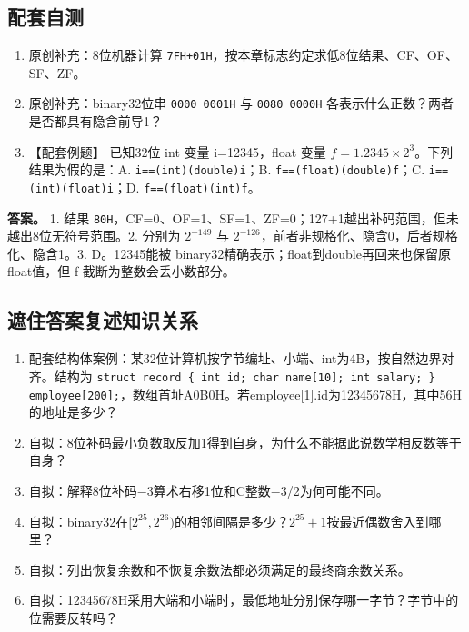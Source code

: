 \subsection{配套自测}\label{CO02-27}

\begin{enumerate}
\def\labelenumi{\arabic{enumi}.}
\tightlist
\item
  原创补充：8位机器计算 \texttt{7FH+\allowbreak{}01H}，按本章标志约定求低8位结果、CF、OF、SF、ZF。
\item
  原创补充：binary32位串 \texttt{0000 0001H} 与 \texttt{0080 0000H} 各表示什么正数？两者是否都具有隐含前导1？
\item
  【配套例题】 已知32位 int 变量 i=12345，float 变量 \(f=1.2345\times2^3\)。下列结果为假的是：A. \texttt{i=\allowbreak{}=\allowbreak{}(\allowbreak{}int)\allowbreak{}(\allowbreak{}double)\allowbreak{}i}；B. \texttt{f=\allowbreak{}=\allowbreak{}(\allowbreak{}float)\allowbreak{}(\allowbreak{}double)\allowbreak{}f}；C. \texttt{i=\allowbreak{}=\allowbreak{}(\allowbreak{}int)\allowbreak{}(\allowbreak{}float)\allowbreak{}i}；D. \texttt{f=\allowbreak{}=\allowbreak{}(\allowbreak{}float)\allowbreak{}(\allowbreak{}int)\allowbreak{}f}。
\end{enumerate}

\textbf{答案。} 1. 结果 \texttt{80H}，CF=0、OF=1、SF=1、ZF=0；127+1越出补码范围，但未越出8位无符号范围。2. 分别为 \(2^{-149}\) 与 \(2^{-126}\)，前者非规格化、隐含0，后者规格化、隐含1。3. D。12345能被 binary32精确表示；float到double再回来也保留原float值，但 f 截断为整数会丢小数部分。

\subsection{遮住答案复述知识关系}\label{CO02-recall-new}

\begin{recallcard}[主动回忆·自拟]

\begin{enumerate}
\def\labelenumi{\arabic{enumi}.}
\setcounter{enumi}{3}
\tightlist
\item
  配套结构体案例：某32位计算机按字节编址、小端、int为4B，按自然边界对齐。结构为 \texttt{struct record \{ int id;\allowbreak{} char name[\allowbreak{}10]\allowbreak{};\allowbreak{} int salary;\allowbreak{} \} employee[\allowbreak{}200]\allowbreak{};\allowbreak{}}，数组首址A0B0H。若employee{[}1{]}.id为12345678H，其中56H的地址是多少？
\item
  自拟：8位补码最小负数取反加1得到自身，为什么不能据此说数学相反数等于自身？
\item
  自拟：解释8位补码\ensuremath{-}3算术右移1位和C整数\ensuremath{-}3/2为何可能不同。
\item
  自拟：binary32在\([2^{25},2^{26})\)的相邻间隔是多少？\(2^{25}+1\)按最近偶数舍入到哪里？
\item
  自拟：列出恢复余数和不恢复余数法都必须满足的最终商余数关系。
\item
  自拟：12345678H采用大端和小端时，最低地址分别保存哪一字节？字节中的位需要反转吗？
\end{enumerate}

\end{recallcard}


